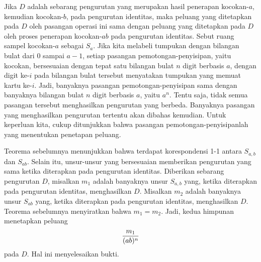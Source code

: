 \begin{theorem}\label{thm 3.3.2} Jika $D$ adalah sebarang pengurutan yang merupakan hasil
penerapan kocokan-$a$, kemudian kocokan-$b$, pada pengurutan identitas, maka peluang yang
ditetapkan pada $D$ oleh pasangan operasi ini sama dengan peluang yang ditetapkan pada
$D$ oleh proses penerapan kocokan-$ab$ pada pengurutan identitas.
\proof Sebut ruang sampel kocokan-$a$ sebagai $S_a$.  Jika kita melabeli tumpukan dengan
bilangan bulat dari $0$ sampai $a-1$, setiap pasangan pemotongan-penyisipan, yaitu
kocokan, bersesuaian dengan tepat satu bilangan bulat $n$ digit berbasis $a$, dengan
digit ke-$i$ pada bilangan bulat tersebut menyatakan tumpukan yang memuat
kartu ke-$i$.  Jadi, banyaknya pasangan pemotongan-penyisipan sama dengan banyaknya
bilangan bulat $n$ digit berbasis $a$, yaitu $a^n$.  Tentu saja, tidak
semua pasangan tersebut menghasilkan pengurutan yang berbeda.  Banyaknya pasangan yang
menghasilkan pengurutan tertentu akan dibahas kemudian.  Untuk keperluan kita, cukup
ditunjukkan bahwa pasangan pemotongan-penyisipanlah yang menentukan penetapan peluang.
\par Teorema sebelumnya menunjukkan bahwa terdapat korespondensi 1-1 antara $S_{a,b}$
dan $S_{ab}$.  Selain itu, unsur-unsur yang bersesuaian memberikan pengurutan yang sama
ketika diterapkan pada pengurutan identitas.  Diberikan sebarang pengurutan $D$, misalkan
$m_1$ adalah banyaknya unsur $S_{a,b}$ yang, ketika diterapkan pada pengurutan identitas,
menghasilkan $D$.  Misalkan $m_2$ adalah banyaknya unsur $S_{ab}$ yang, ketika diterapkan
pada pengurutan identitas, menghasilkan $D$.  Teorema sebelumnya menyiratkan bahwa $m_1
= m_2$.  Jadi, kedua himpunan menetapkan peluang
$${{m_1}\over{(ab)^n}}$$
pada $D$.  Hal ini menyelesaikan bukti.
\end{theorem}

